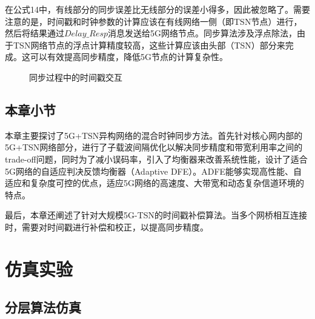 \documentclass[UTF8,a4paper,12pt]{ctexart}
\numberwithin{equation}{section}
\begin{document}
在公式14中，有线部分的同步误差比无线部分的误差小得多，因此被忽略了。需要注意的是，时间戳和时钟参数的计算应该在有线网络一侧（即TSN节点）进行，然后将结果通过$Delay\_Resp$消息发送给5G网络节点。同步算法涉及浮点除法，由于TSN网络节点的浮点计算精度较高，这些计算应该由头部（TSN）部分来完成。这可以有效提高同步精度，降低5G节点的计算复杂性。
\begin{figure}[H] 
	\caption{同步过程中的时间戳交互}
\end{figure}

\subsection{本章小节}
本章主要探讨了5G+TSN异构网络的混合时钟同步方法。首先针对核心网内部的5G+TSN网络部分，进行了子载波间隔优化以解决同步精度和带宽利用率之间的trade-off问题，同时为了减小误码率，引入了均衡器来改善系统性能，设计了适合5G网络的自适应判决反馈均衡器（Adaptive DFE）。ADFE能够实现高性能、自适应和复杂度可控的优点，适应5G网络的高速度、大带宽和动态复杂信道环境的特点。

最后，本章还阐述了针对大规模5G-TSN的时间戳补偿算法。当多个网桥相互连接时，需要对时间戳进行补偿和校正，以提高同步精度。
\newpage
{}
\section{仿真实验}
\subsection{分层算法仿真}
\end{document}
